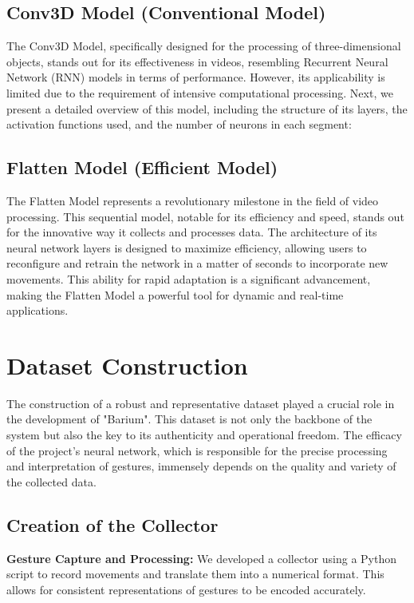 \documentclass{article}
\begin{document}
\subsection{Conv3D Model (Conventional Model)}
The Conv3D Model, specifically designed for the processing of three-dimensional objects, stands out for its effectiveness in videos, resembling Recurrent Neural Network (RNN) models in terms of performance. However, its applicability is limited due to the requirement of intensive computational processing. Next, we present a detailed overview of this model, including the structure of its layers, the activation functions used, and the number of neurons in each segment:

\subsection{Flatten Model (Efficient Model)}
The Flatten Model represents a revolutionary milestone in the field of video processing. This sequential model, notable for its efficiency and speed, stands out for the innovative way it collects and processes data. The architecture of its neural network layers is designed to maximize efficiency, allowing users to reconfigure and retrain the network in a matter of seconds to incorporate new movements. This ability for rapid adaptation is a significant advancement, making the Flatten Model a powerful tool for dynamic and real-time applications.

\section{Dataset Construction}

The construction of a robust and representative dataset played a crucial role in the development of "Barium". This dataset is not only the backbone of the system but also the key to its authenticity and operational freedom. The efficacy of the project's neural network, which is responsible for the precise processing and interpretation of gestures, immensely depends on the quality and variety of the collected data.

\subsection{Creation of the Collector}

\textbf{Gesture Capture and Processing:} We developed a collector using a Python script to record movements and translate them into a numerical format. This allows for consistent representations of gestures to be encoded accurately.
\end{document}
